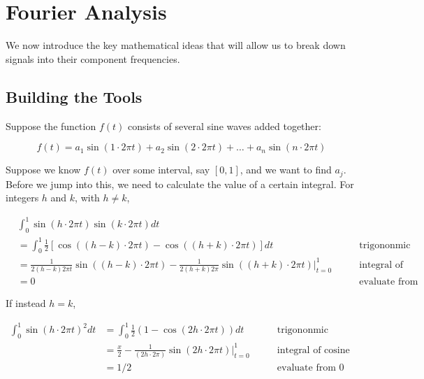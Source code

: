 \documentclass{article}
\begin{document}
\section{Fourier Analysis}
We now introduce the key mathematical ideas that will allow us to break down signals into their component frequencies.

\subsection{Building the Tools}
Suppose the function $f(t)$ consists of several sine waves added together:

\[f(t) = a_1\sin(1 \cdot 2\pi t) + a_2\sin(2 \cdot 2\pi t)+\dots + a_n\sin(n \cdot 2\pi t)\]



Suppose we know $f(t)$ over some interval, say $[0,1]$, and we want to find $a_j$.  Before we jump into this, we need to calculate the value of a certain integral.   For integers $h$ and $k$, with $h\neq k$,

\begin{align*}
&\int_{0}^1 \sin(h \cdot 2\pi t)\sin(k \cdot 2\pi t) dt \\
& =  \int_{0}^1 \frac{1}{2}\left[\cos((h-k) \cdot 2\pi t) -\cos((h+k) \cdot 2\pi t) \right]dt  \qquad\qquad\qquad&\text{trigononmic identity (substitution)}\\
& =\frac{1}{2(h-k)2\pi t}\sin((h-k) \cdot 2\pi t) - \frac{1}{2(h+k)2\pi}\sin((h+k) \cdot 2\pi t)\Big|_{t=0}^1 \qquad&\text{integral of cosine is sine}\\
&  = 0&\text{evaluate from 0 to 1}
\end{align*}

If instead $h=k$,

\begin{align*}
\int_{0}^1 \sin(h \cdot 2\pi t)^2 dt & = \int_{0}^1 \frac{1}{2} (1 - \cos(2h \cdot 2\pi t))dt \qquad & \text{trigononmic identity (substitution)}\\
& = \frac{x}{2} - \frac{1}{(2h \cdot 2\pi)}\sin(2h \cdot 2\pi t)\Big |_{t=0}^1 \qquad &  \text{integral of cosine is sine}\\
& = 1/2&\text{evaluate from 0 to 1}
\end{align*}
\end{document}
